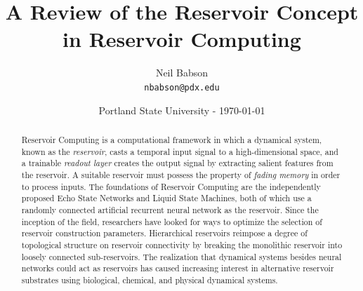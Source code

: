 \documentclass{article}
\title{A Review of the Reservoir Concept in Reservoir Computing}
\author{Neil Babson\\ \texttt{nbabson@pdx.edu}}
\date{Portland State University -  \today}
\begin{document}
\maketitle

\doublespacing

\begin{abstract}

Reservoir Computing is a computational framework in which a 
dynamical system, known as the \textit{reservoir}, casts a temporal input 
signal to a high-dimensional space, and a trainable \textit{readout layer} 
creates the output signal by extracting salient features from the reservoir.
A suitable reservoir  must possess the property of 
\textit{fading memory} in order to process inputs. The foundations of Reservoir Computing are the 
independently proposed Echo State Networks and Liquid State Machines, both of 
which use a randomly connected artificial recurrent neural network as the 
reservoir. Since the inception of the field, researchers have looked for ways 
to optimize the selection of reservoir construction parameters. Hierarchical 
reservoirs reimpose a degree of topological structure on reservoir connectivity 
by breaking the monolithic reservoir into loosely connected sub-reservoirs. The 
realization that dynamical systems besides neural networks could act as 
reservoirs has caused increasing interest in alternative reservoir substrates 
using biological, chemical, and physical dynamical systems.

\end{abstract}
\end{document}
